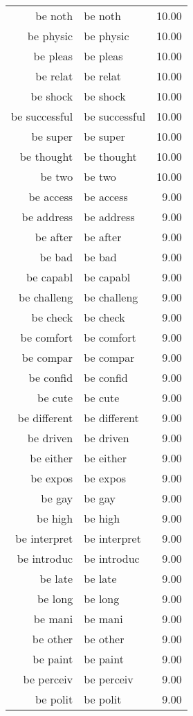 \begin{table}[ht]
\begin{tabular}{rlr}
  be noth & be noth & 10.00 \\ 
  be physic & be physic & 10.00 \\ 
  be pleas & be pleas & 10.00 \\ 
  be relat & be relat & 10.00 \\ 
  be shock & be shock & 10.00 \\ 
  be successful & be successful & 10.00 \\ 
  be super & be super & 10.00 \\ 
  be thought & be thought & 10.00 \\ 
  be two & be two & 10.00 \\ 
  be access & be access & 9.00 \\ 
  be address & be address & 9.00 \\ 
  be after & be after & 9.00 \\ 
  be bad & be bad & 9.00 \\ 
  be capabl & be capabl & 9.00 \\ 
  be challeng & be challeng & 9.00 \\ 
  be check & be check & 9.00 \\ 
  be comfort & be comfort & 9.00 \\ 
  be compar & be compar & 9.00 \\ 
  be confid & be confid & 9.00 \\ 
  be cute & be cute & 9.00 \\ 
  be different & be different & 9.00 \\ 
  be driven & be driven & 9.00 \\ 
  be either & be either & 9.00 \\ 
  be expos & be expos & 9.00 \\ 
  be gay & be gay & 9.00 \\ 
  be high & be high & 9.00 \\ 
  be interpret & be interpret & 9.00 \\ 
  be introduc & be introduc & 9.00 \\ 
  be late & be late & 9.00 \\ 
  be long & be long & 9.00 \\ 
  be mani & be mani & 9.00 \\ 
  be other & be other & 9.00 \\ 
  be paint & be paint & 9.00 \\ 
  be perceiv & be perceiv & 9.00 \\ 
  be polit & be polit & 9.00 \\ 

\end{tabular}
\end{table}
